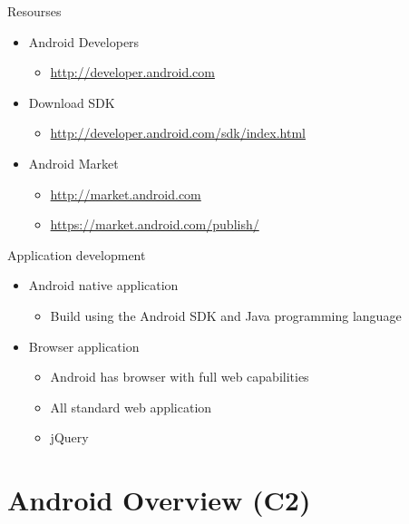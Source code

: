 \begin{frame}{Resourses}
\begin{itemize}
    \item Android Developers
        \begin{itemize}
          \item \href{http://developer.android.com}{http://developer.android.com}
        \end{itemize}
    \item Download SDK
        \begin{itemize}
          \item \href{http://developer.android.com/sdk/index.html}{http://developer.android.com/sdk/index.html}
        \end{itemize}
    \item Android Market
        \begin{itemize}
          \item \href{http://market.android.com}{http://market.android.com}
          \item \href{https://market.android.com/publish/}{https://market.android.com/publish/}
        \end{itemize}
\end{itemize}
\end{frame}

\begin{frame}{Application development}
\begin{itemize}
  \item Android native application
  \begin{itemize}
    \item Build using the Android SDK and Java programming
language
  \end{itemize}
  \item Browser application
  \begin{itemize}
    \item Android has browser with full web capabilities
    \item All standard web application
    \item jQuery
  \end{itemize}
\end{itemize}
\end{frame}

\section{Android Overview (C2)}

